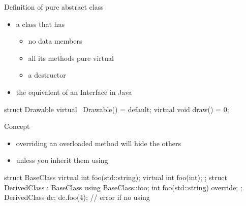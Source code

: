 \begin{frame}[fragile]
  \begin{block}{Definition of pure abstract class}
    \begin{itemize}
    \item a class that has
      \begin{itemize}
        \item no data members
        \item all its methods pure virtual
        \item a  destructor
      \end{itemize}
    \item the equivalent of an Interface in Java
    \end{itemize}
  \end{block}
  \begin{multicols}{2}
    \begin{cppcode*}{}
      struct Drawable {
        virtual ~Drawable()
                      = default;
        virtual void draw() = 0;
      }
    \end{cppcode*}
    \columnbreak
    \center
  \end{multicols}
\end{frame}

\begin{frame}[fragile]
  \begin{block}{Concept}
    \begin{itemize}
    \item overriding an overloaded method will hide the others
    \item unless you inherit them using 
    \end{itemize}
  \end{block}
  \begin{cppcode*}{}
    struct BaseClass {
      virtual int foo(std::string);
      virtual int foo(int);
    };
    struct DerivedClass : BaseClass {
      using BaseClass::foo;
      int foo(std::string) override;
    };
    DerivedClass dc;
    dc.foo(4);      // error if no using
    \end{cppcode*}
\end{frame}

